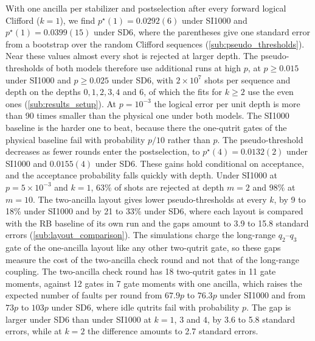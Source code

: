 With one ancilla per stabilizer and postselection after every forward logical Clifford ($k=1$), we find $p^\star(1) = 0.0292(6)$ under SI1000 and $p^\star(1) = 0.0399(15)$ under SD6, where the parentheses give one standard error from a bootstrap over the random Clifford sequences (\autoref{sub:pseudo_thresholds}).
Near these values almost every shot is rejected at larger depth. The pseudo-thresholds of both models therefore use additional runs at high $p$, at $p \geq 0.015$ under SI1000 and $p \geq 0.025$ under SD6, with $2\times 10^{7}$ shots per sequence and depth on the depths $0, 1, 2, 3, 4$ and $6$, of which the fits for $k \ge 2$ use the even ones (\autoref{sub:results_setup}).
At $p = 10^{-3}$ the logical error per unit depth is more than 90 times smaller than the physical one under both models. The SI1000 baseline is the harder one to beat, because there the one-qutrit gates of the physical baseline fail with probability $p/10$ rather than $p$. The pseudo-threshold decreases as fewer rounds enter the postselection, to $p^\star(4) = 0.0132(2)$ under SI1000 and $0.0155(4)$ under SD6.
These gains hold conditional on acceptance, and the acceptance probability falls quickly with depth. Under SI1000 at $p = 5\times 10^{-3}$ and $k = 1$, $63\%$ of shots are rejected at depth $m = 2$ and $98\%$ at $m = 10$.
The two-ancilla layout gives lower pseudo-thresholds at every $k$, by 9 to 18\% under SI1000 and by 21 to 33\% under SD6, where each layout is compared with the RB baseline of its own run and the gaps amount to 3.9 to 15.8 standard errors (\autoref{sub:layout_comparison}). The simulations charge the long-range $q_2$--$q_3$ gate of the one-ancilla layout like any other two-qutrit gate, so these gaps measure the cost of the two-ancilla check round and not that of the long-range coupling. The two-ancilla check round has 18 two-qutrit gates in 11 gate moments, against 12 gates in 7 gate moments with one ancilla, which raises the expected number of faults per round from $67.9p$ to $76.3p$ under SI1000 and from $73p$ to $103p$ under SD6, where idle qutrits fail with probability $p$. The gap is larger under SD6 than under SI1000 at $k = 1$, $3$ and $4$, by 3.6 to 5.8 standard errors, while at $k = 2$ the difference amounts to 2.7 standard errors.

